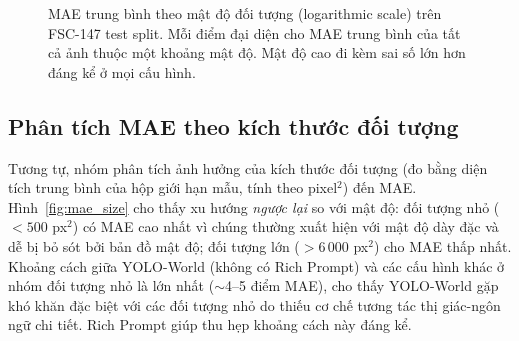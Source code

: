 \documentclass[a4paper,12pt]{report}
\numberwithin{figure}{chapter}
\numberwithin{table}{chapter}
\begin{document}
\begin{figure}[H]
\centering
{}
\caption{MAE trung bình theo mật độ đối tượng (logarithmic scale) trên FSC-147 test split. Mỗi điểm đại diện cho MAE trung bình của tất cả ảnh thuộc một khoảng mật độ. Mật độ cao đi kèm sai số lớn hơn đáng kể ở mọi cấu hình.}
\label{fig:mae_density}
\end{figure}

\subsection{Phân tích MAE theo kích thước đối tượng}
\label{subsec:mae-vs-size}

Tương tự, nhóm phân tích ảnh hưởng của kích thước đối tượng (đo bằng diện tích trung bình của hộp giới hạn mẫu, tính theo pixel$^2$) đến MAE. Hình~\ref{fig:mae_size} cho thấy xu hướng \emph{ngược lại} so với mật độ: đối tượng nhỏ ($<500$ px$^2$) có MAE cao nhất vì chúng thường xuất hiện với mật độ dày đặc và dễ bị bỏ sót bởi bản đồ mật độ; đối tượng lớn ($>6\,000$ px$^2$) cho MAE thấp nhất. Khoảng cách giữa YOLO-World (không có Rich Prompt) và các cấu hình khác ở nhóm đối tượng nhỏ là lớn nhất ($\sim$4--5 điểm MAE), cho thấy YOLO-World gặp khó khăn đặc biệt với các đối tượng nhỏ do thiếu cơ chế tương tác thị giác-ngôn ngữ chi tiết. Rich Prompt giúp thu hẹp khoảng cách này đáng kể.
\end{document}
